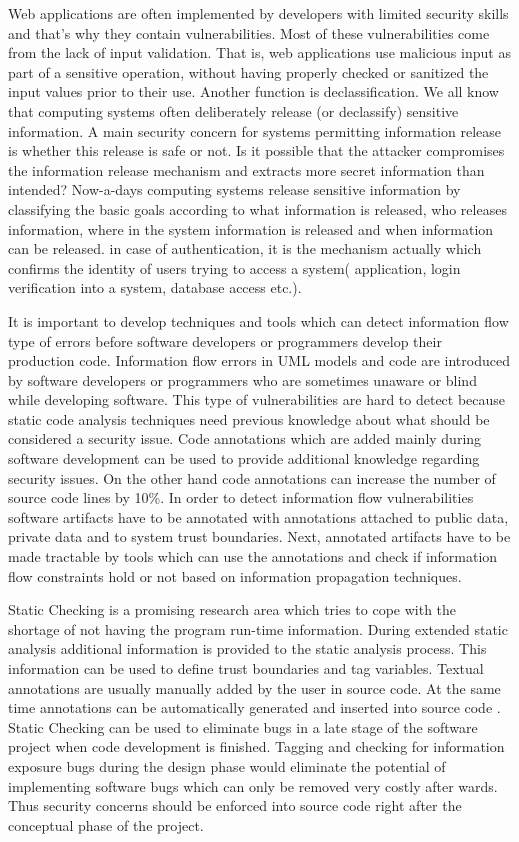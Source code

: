 Web applications are often implemented by developers with limited security skills and that's why they contain vulnerabilities. Most of these vulnerabilities come from the lack of input validation. That is, web applications use malicious input as part of a sensitive operation, without having properly checked or sanitized the input values
prior to their use. Another function is declassification. We all know that computing systems often deliberately release (or declassify) sensitive information. A main security concern for systems permitting information release is whether this release is safe or not. Is it possible that the attacker compromises the information release mechanism and extracts more secret information than intended? Now-a-days computing systems release sensitive information by classifying the basic goals according to what information is released, who releases information, where in the system information is released and when information can be released. in case of authentication, it is the mechanism actually which confirms the identity of users trying to access a system( application, login verification into a system, database access etc.). 

It is important to develop techniques and tools which can detect information flow type of errors before software developers or programmers develop their production code. Information flow errors in UML models and code are introduced by software developers or programmers who are sometimes unaware or blind while developing software. This type of vulnerabilities are hard to detect because static code analysis techniques need previous knowledge about what should be considered a security issue. Code annotations which are added mainly during software development \cite{ref_18_chess2004static} can be used to provide additional knowledge regarding security issues. On the other hand code annotations can increase the number of source code lines by 10\%. In order to detect information flow vulnerabilities software artifacts have to be annotated with annotations attached to public data, private data and to system trust boundaries. Next, annotated artifacts have to be made tractable by tools which can use the annotations and check if information flow constraints hold or not based on information propagation techniques.

Static Checking is a promising research area which tries to cope with the shortage of not having the program run-time information. During extended static analysis additional information is provided to the static analysis process. This information can be used to define trust boundaries and tag variables. Textual annotations are usually manually added by the user in source code. At the same time annotations can be automatically generated and inserted into source code . Static Checking can be used to eliminate bugs in a late stage of the software project when code development is finished. Tagging and checking for information exposure bugs during the design phase would eliminate the potential of implementing software bugs which can only be removed very costly after wards. Thus security concerns should be enforced into source code right after the conceptual phase of the project.

